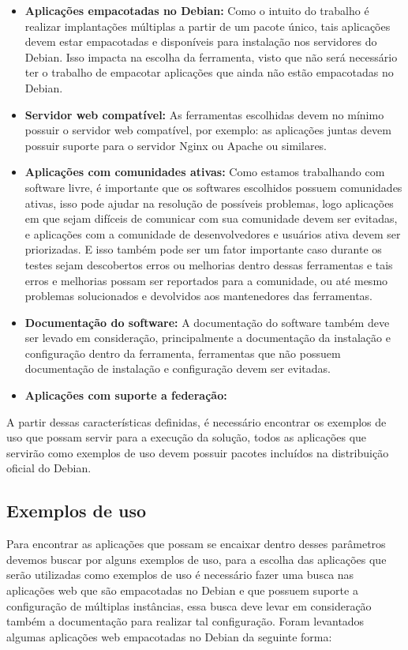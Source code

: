 \begin{itemize}
  \item  \textbf{Aplicações empacotadas no Debian:} Como o intuito do trabalho
  é realizar implantações múltiplas a partir de um pacote único, tais aplicações
  devem estar empacotadas e disponíveis para instalação nos servidores do Debian.
  Isso impacta na escolha da ferramenta, visto que não será necessário ter o trabalho
  de empacotar aplicações que ainda não estão empacotadas no Debian.
  \item  \textbf{Servidor web compatível:} As ferramentas escolhidas devem no
  mínimo possuir o servidor web compatível, por exemplo: as aplicações juntas
  devem possuir suporte para o servidor Nginx ou Apache ou similares.
  \item  \textbf{Aplicações com comunidades ativas:} Como estamos trabalhando
  com software livre, é importante que os softwares escolhidos possuem comunidades
  ativas, isso pode ajudar na resolução de possíveis problemas, logo aplicações
  em que sejam difíceis de comunicar com sua comunidade devem ser evitadas, e
  aplicações com a comunidade de desenvolvedores e usuários ativa devem ser priorizadas.
  E isso também pode ser um fator importante caso durante os testes sejam descobertos
  erros ou melhorias dentro dessas ferramentas e tais erros e melhorias possam ser
  reportados para a comunidade, ou até mesmo problemas solucionados e devolvidos aos mantenedores
  das ferramentas.
  \item  \textbf{Documentação do software:} A documentação do software também deve
  ser levado em consideração, principalmente a documentação da instalação e configuração
  dentro da ferramenta, ferramentas que não possuem documentação de instalação e
  configuração devem ser evitadas.
  \item  \textbf{Aplicações com suporte a federação:} %
\end{itemize}

A partir dessas características definidas, é necessário encontrar os exemplos de uso
que possam servir para a execução da solução, todos as aplicações que servirão como
exemplos de uso devem possuir pacotes incluídos na distribuição oficial do Debian.

\subsection{Exemplos de uso}
\label{subsection:exemplos}

Para encontrar as aplicações que possam se encaixar dentro desses parâmetros
devemos buscar por alguns exemplos de uso, para a escolha das aplicações que
serão utilizadas como exemplos de uso é necessário fazer uma busca nas aplicações
web que são empacotadas no Debian e que possuem suporte a configuração de múltiplas
instâncias, essa busca deve levar em consideração também a documentação para realizar
tal configuração. Foram levantados algumas aplicações web empacotadas no Debian da
seguinte forma:

